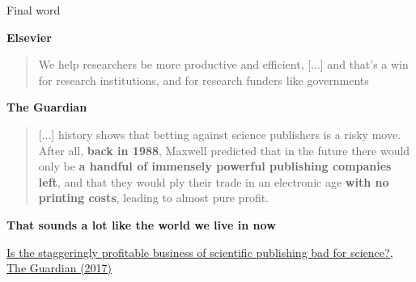 \documentclass[10pt,compress,serif,aspectratio=169]{beamer}
\begin{document}
\begin{frame}[t]{Final word}


\vfill

\textbf{Elsevier}
\begin{quote}
  We help researchers be more productive and efficient, [...] %
  and that’s a win for research institutions, and for research funders like governments
\end{quote}


\textbf{The Guardian}
\begin{quote}
[...] history shows that betting against science publishers is a risky move. After all, \textbf{back in 1988}, Maxwell predicted that in the future there would only be \textbf{a handful of immensely powerful publishing companies left}, and that they would ply their trade in an electronic age \textbf{with no printing costs}, leading to almost pure profit. 
\end{quote}
\pause
\begin{center}
  \textbf{That sounds a lot like the world we live in now}
\end{center}
\pause
\href{https://www.theguardian.com/science/2017/jun/27/profitable-business-scientific-publishing-bad-for-science}{Is the staggeringly profitable business of scientific publishing bad for science?, The Guardian (2017)}

\end{frame}
\end{document}
